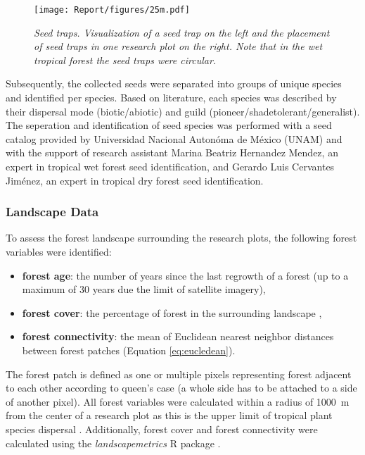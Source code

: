 \begin{figure}[htbp]
\centering
\texttt{[image: Report/figures/25m.pdf]}
\caption{\textit{Seed traps. Visualization of a seed trap on the left and the placement of seed traps in one research plot on the right. Note that in the wet tropical forest the seed traps were circular.}}
\label{fig:st}
\end{figure}

Subsequently, the collected seeds were separated into groups of unique species and identified per species. Based on literature, each species was described by their dispersal mode (biotic/abiotic) and guild (pioneer/shadetolerant/generalist). The seperation and identification of seed species was performed with a seed catalog provided by Universidad Nacional Autonóma de México (UNAM) and with the support of research assistant Marina Beatriz Hernandez Mendez, an expert in tropical wet forest seed identification, and Gerardo Luis Cervantes Jiménez, an expert in tropical dry forest seed identification. 


\subsubsection{Landscape Data}

To  assess the forest landscape surrounding the research plots, the following forest variables were identified:
\begin{itemize}
    \item \textbf{forest age}: the number of years since the last regrowth of a forest (up to a maximum of 30 years due the limit of satellite imagery),
    \item \textbf{forest cover}: the percentage of forest in the surrounding landscape \citep{hesselbarthLandscapemetricsOpensourceTool2019}, 
    \item \textbf{forest connectivity}: the mean of Euclidean nearest neighbor distances between forest patches (Equation \ref{eq:eucledean}). 
\end{itemize}

The forest patch is defined as one or multiple pixels representing forest adjacent to each other according to queen's case (a whole side has to be attached to a side of another pixel). All forest variables were calculated within a radius of 1000~m from the center of a research plot as this is the upper limit of tropical plant species dispersal \citep{corlettSeedDispersalDistances2009}. Additionally, forest cover and forest connectivity were calculated using the \textit{landscapemetrics} R package \citep{hesselbarthLandscapemetricsOpensourceTool2019}.  \\

